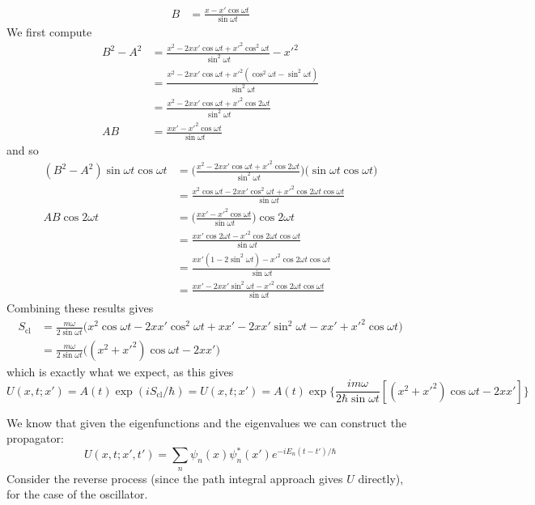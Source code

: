 \documentclass[../principles-of-quantum-mechanics.tex]{subfiles}
\begin{document}
\begin{questions}
\begin{solution}
\begin{align*}
				B &= \frac{x - x'\cos\omega t}{\sin\omega t}
			\end{align*}
			We first compute
			\begin{align*}
				B^2 - A^2 &= \frac{x^2 - 2xx'\cos\omega t + x'^2\cos^2\omega t}{\sin^2\omega t} - x'^2 \\
				&= \frac{x^2 - 2xx'\cos\omega t + x'^2(\cos^2\omega t - \sin^2\omega t)}{\sin^2\omega t} \\
				&= \frac{x^2 - 2xx'\cos\omega t + x'^2\cos 2\omega t}{\sin^2\omega t} \\
				AB &= \frac{xx' - x'^2\cos\omega t}{\sin\omega t}
			\end{align*}
			and so
			\begin{align*}
				(B^2 - A^2)\sin\omega t \cos\omega t &= \Big(\frac{x^2 - 2xx'\cos\omega t + x'^2\cos 2\omega t}{\sin^2\omega t}\Big)\big(\sin\omega t \cos \omega t\big) \\
				&= \frac{x^2\cos\omega t - 2xx'\cos^2\omega t + x'^2\cos2\omega t \cos\omega t}{\sin\omega t} \\
				AB\cos 2 \omega t &= \Big(\frac{xx' - x'^2\cos\omega t}{\sin\omega t}\Big)\cos 2 \omega t \\
				&= \frac{xx'\cos 2 \omega t - x'^2\cos2\omega t \cos \omega t}{\sin \omega t} \\
				&= \frac{xx'(1 - 2\sin^2 \omega t) - x'^2\cos2\omega t \cos \omega t}{\sin \omega t} \\
				&= \frac{xx' - 2xx'\sin^2\omega t - x'^2\cos2\omega t \cos\omega t}{\sin\omega t}
			\end{align*}
			Combining these results gives
			\begin{align*}
				S_{\text{cl}} &= \frac{m\omega}{2\sin \omega t}\Big(x^2\cos\omega t - 2xx'\cos^2\omega t + xx' - 2xx'\sin^2\omega t - xx' + x'^2\cos\omega t\Big) \\
				&= \frac{m\omega}{2\sin \omega t}\Big((x^2 + x'^2)\cos\omega t - 2xx'\Big)
			\end{align*}
			which is exactly what we expect, as this gives
			$$U(x, t; x') = A(t)\exp(iS_{\text{cl}}/\hbar) = U(x, t; x') = A(t)\exp\Big\{\frac{im\omega}{2\hbar\sin \omega t}[(x^2 + x'^2)\cos \omega t - 2xx']\Big\}$$
		\end{solution}
		
		\question We know that given the eigenfunctions and the eigenvalues we can construct the propagator:
		$$U(x, t; x', t') = \sum_n\psi_n(x)\psi_n^*(x')e^{-iE_n(t - t')/\hbar}$$
		Consider the reverse process (since the path integral approach gives $U$ directly), for the case of the oscillator.
		

\end{questions}
\end{document}
